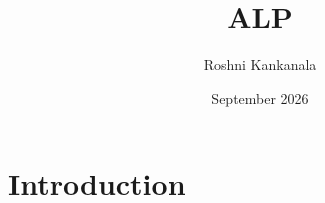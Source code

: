 \documentclass{article}
\title{ALP}
\author{Roshni Kankanala}
\date{September 2026}
\begin{document}
\maketitle

\section{Introduction}
\end{document}
